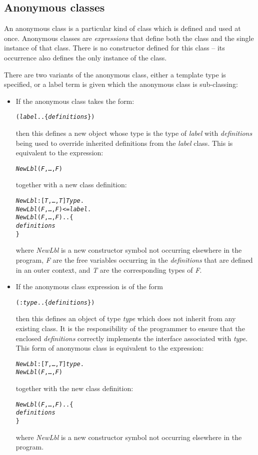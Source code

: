 \subsection{Anonymous classes}
\label{lo:anonymous}
An anonymous class is a particular kind of class which is defined and used at once. Anonymous classes are \emph{expressions} that define both the class and the single instance of that class. There is no constructor defined for this class -- its occurrence also defines the only instance of the class.

There are two variants of the anonymous class, either a template type is specified, or a label term is given which the anonymous class is sub-classing:
\begin{itemize}
\item
If the anonymous class takes the form:
\begin{alltt}
(\emph{label}..\{ \emph{definitions} \})
\end{alltt}
then this defines a new object whose type is the type of \emph{label} with \emph{definitions} being used to override inherited definitions from the \emph{label} class. This is equivalent to the expression:
\begin{alltt}
\emph{NewLbl}(\emph{F},\ldots,\emph{F\subn})
\end{alltt}
together with a new class definition:
\begin{alltt}
\emph{NewLbl}:[\emph{T},\ldots,\emph{T}]\sconarrow{}\emph{Type}.
\emph{NewLbl}(\emph{F},\ldots,\emph{F\subn}) <= \emph{label}.
\emph{NewLbl}(\emph{F},\ldots,\emph{F\subn})..\{
  \emph{definitions}
\}
\end{alltt}
where \emph{NewLbl} is a new constructor symbol not occurring elsewhere in the program, \emph{F\subi} are the free variables occurring in the \emph{definitions} that are defined in an outer context, and \emph{T} are the corresponding types of \emph{F\subi}.
\item
If the anonymous class expression is of the form
\begin{alltt}
(:\emph{type}..\{ \emph{definitions} \})
\end{alltt}
then this defines an object of type \emph{type} which does not inherit from any existing class. It is the responsibility of the programmer to ensure that the enclosed \emph{definitions} correctly implements the interface associated with \emph{type}. This form of anonymous class is equivalent to the expression:
\begin{alltt}
\emph{NewLbl}:[\emph{T},\ldots,\emph{T}]\sconarrow{}\emph{type}.
\emph{NewLbl}(\emph{F},\ldots,\emph{F\subn})
\end{alltt}
together with the new class definition:
\begin{alltt}
\emph{NewLbl}(\emph{F},\ldots,\emph{F\subn})..\{
  \emph{definitions}
\}
\end{alltt}
where \emph{NewLbl} is a new constructor symbol not occurring elsewhere in the program.
\end{itemize}

